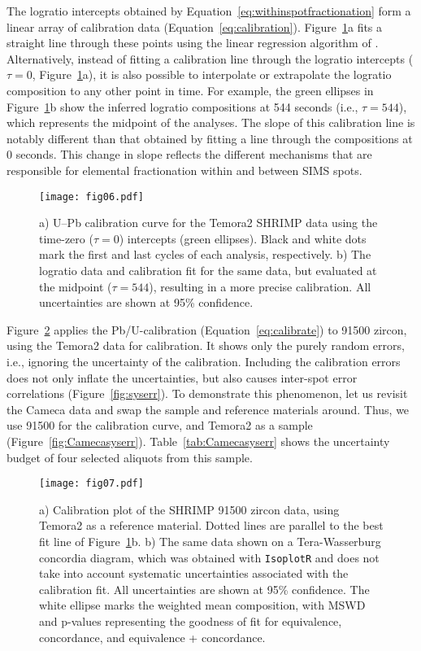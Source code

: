 \documentclass{article}
\begin{document}
The logratio intercepts obtained by
Equation~\ref{eq:withinspotfractionation} form a linear array of
calibration data
(Equation~\ref{eq:calibration}). Figure~\ref{fig:calibration}a fits a
straight line through these points using the linear regression
algorithm of \citet{york2004}. Alternatively, instead of fitting a
calibration line through the logratio intercepts ($\tau = 0$,
Figure~\ref{fig:calibration}a), it is also possible to interpolate or
extrapolate the logratio composition to any other point in time. For
example, the green ellipses in Figure~\ref{fig:calibration}b show the
inferred logratio compositions at 544 seconds (i.e., $\tau = 544$),
which represents the midpoint of the analyses. The slope of this
calibration line is notably different than that obtained by fitting a
line through the compositions at 0 seconds. This change in slope
reflects the different mechanisms that are responsible for elemental
fractionation within and between SIMS spots.\medskip

\begin{figure}[!htbp]
  \centering
  \texttt{[image: fig06.pdf]}
  \parbox{\textwidth}{
  \caption{a) U--Pb calibration curve for the Temora2 SHRIMP data
    using the time-zero ($\tau = 0$) intercepts (green
    ellipses). Black and white dots mark the first and last cycles of
    each analysis, respectively. b) The logratio data and calibration
    fit for the same data, but evaluated at the midpoint ($\tau =
    544$), resulting in a more precise calibration. All uncertainties
    are shown at 95\% confidence.}
  \label{fig:calibration}
  }
\end{figure}

Figure~\ref{fig:91500} applies the Pb/U-calibration
(Equation~\ref{eq:calibrate}) to 91500 zircon, using the Temora2 data
for calibration. It shows only the purely random errors, i.e.,
ignoring the uncertainty of the calibration. Including the calibration
errors does not only inflate the uncertainties, but also causes
inter-spot error correlations (Figure~\ref{fig:syserr}). To
demonstrate this phenomenon, let us revisit the Cameca data and swap
the sample and reference materials around. Thus, we use 91500 for the
calibration curve, and Temora2 as a sample
(Figure~\ref{fig:Camecasyserr}). Table~\ref{tab:Camecasyserr} shows
the uncertainty budget of four selected aliquots from this
sample.\medskip

\begin{figure}[!htbp]
  \centering \texttt{[image: fig07.pdf]}
  \caption{a) Calibration plot of the SHRIMP 91500 zircon data, using
    Temora2 as a reference material.  Dotted lines are parallel to the
    best fit line of Figure~\ref{fig:calibration}b.  b) The same data
    shown on a Tera-Wasserburg concordia diagram, which was obtained
    with \texttt{IsoplotR} and does not take into account systematic
    uncertainties associated with the calibration fit. All
    uncertainties are shown at 95\% confidence. The white ellipse
    marks the weighted mean composition, with MSWD and p-values
    representing the goodness of fit for equivalence, concordance, and
    equivalence + concordance.}
    \label{fig:91500}
\end{figure}
\end{document}
